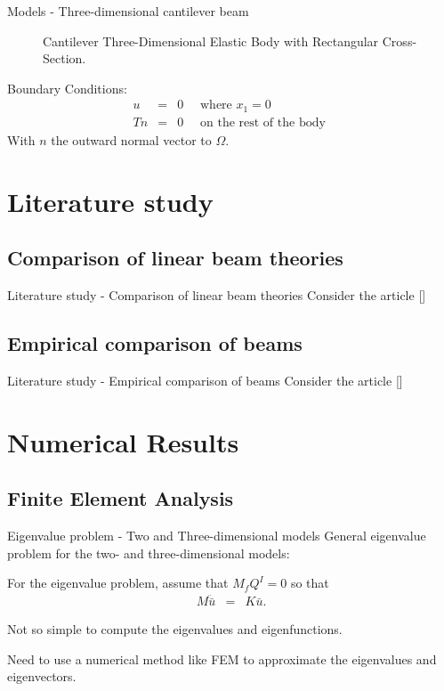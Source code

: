 \documentclass[8pt]{beamer}
\begin{document}
\begin{frame}{Models - Three-dimensional cantilever beam}
\begin{figure}[h!]
\begin{tikzpicture}[scale=0.58]
                \end{tikzpicture}
                \caption{Cantilever Three-Dimensional Elastic Body with Rectangular Cross-Section.}
            \end{figure} 
            Boundary Conditions:
            \begin{eqnarray*}
                u & = & 0 \quad \textrm{ where } x_1 = 0\\
                Tn & = & 0 \quad \textrm{ on the rest of the body }
            \end{eqnarray*} With $n$ the outward normal vector to $\Omega$.
        \end{frame}

\section{Literature study}
    \subsection{Comparison of linear beam theories}
        \begin{frame}{Literature study - Comparison of linear beam theories}
            Consider the article [\cite{LVV09}]
        \end{frame}

    \subsection{Empirical comparison of beams}
        \begin{frame}{Literature study - Empirical comparison of beams}
            Consider the article [\cite{SP06}]
        \end{frame}

\section{Numerical Results}
    \subsection{Finite Element Analysis}
        \begin{frame}{Eigenvalue problem - Two and Three-dimensional models}
            General eigenvalue problem for the two- and three-dimensional models:
            
                For the eigenvalue problem, assume that $M_{f}Q^I = 0$ so that 
            \begin{eqnarray}
                    M\ddot{\bar{u}} & = & K\bar{u}.\label{eq:2DFEM:M2}
            \end{eqnarray}
            
            Not so simple to compute the eigenvalues and eigenfunctions.
            
            Need to use a numerical method like FEM to approximate the eigenvalues and eigenvectors.
        
        \end{frame}
        
\end{document}
